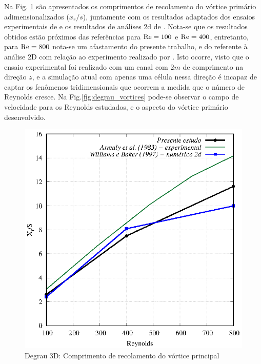 \documentclass[tese_patricia]{subfiles}
\begin{document}
Na Fig. \ref{fig:degrau_com_recl} são apresentados os comprimentos de recolamento do vórtice primário adimensionalizados ($x_{r}/s$), juntamente com os resultados adaptados dos ensaios experimentais de  e os resultados de análises 2d de . Nota-se que os resultados obtidos estão próximos das referências para $\mathrm{Re} = 100$ e $\mathrm{Re} =400$, entretanto, para $\mathrm{Re} = 800$ nota-se um afastamento do presente trabalho, e do referente à análise 2D com relação ao experimento realizado por . Isto ocorre, visto que o ensaio experimental foi realizado com um canal com $2m$ de comprimento na direção $z$, e a simulação atual com apenas uma célula nessa direção é incapaz de captar os fenômenos tridimensionais que ocorrem a medida que o número de Reynolds cresce. Na Fig.\ref {fig:degrau_vortices} pode-se observar o campo de velocidade para os Reynolds estudados, e o aspecto do vórtice primário desenvolvido.


\begin{figure}[htb!]
	\centering
	\includegraphics[scale=1.2,trim=0cm 0cm 0cm 0cm, clip=true]{Imagens/Cap3/comvort.eps}
	\caption{Degrau 3D: Comprimento de recolamento do v\'ortice principal}
	\label{fig:degrau_com_recl}
\end{figure}
\end{document}
